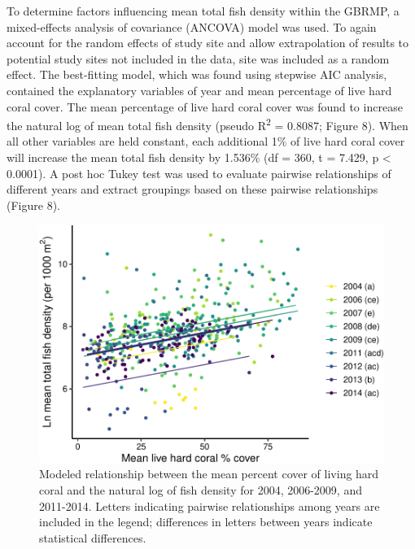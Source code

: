 \documentclass[12pt,]{article}
\begin{document}
To determine factors influencing mean total fish density within the
GBRMP, a mixed-effects analysis of covariance (ANCOVA) model was used.
To again account for the random effects of study site and allow
extrapolation of results to potential study sites not included in the
data, site was included as a random effect. The best-fitting model,
which was found using stepwise AIC analysis, contained the explanatory
variables of year and mean percentage of live hard coral cover. The mean
percentage of live hard coral cover was found to increase the natural
log of mean total fish density (pseudo R\textsuperscript{2} = 0.8087;
Figure 8). When all other variables are held constant, each additional
1\% of live hard coral cover will increase the mean total fish density
by 1.536\% (df = 360, t = 7.429, p \textless{} 0.0001). A post hoc Tukey
test was used to evaluate pairwise relationships of different years and
extract groupings based on these pairwise relationships (Figure 8).

\begin{figure}

{\centering \includegraphics{Mullaney_ENV872_Project_files/figure-latex/Fish Density Plot-1} 

}

\caption{Modeled relationship between the mean percent cover of living hard coral and the natural log of fish density for 2004, 2006-2009, and 2011-2014. Letters indicating pairwise relationships among years are included in the legend; differences in letters between years indicate statistical differences.}\label{fig:Fish Density Plot}
\end{figure}
\end{document}
